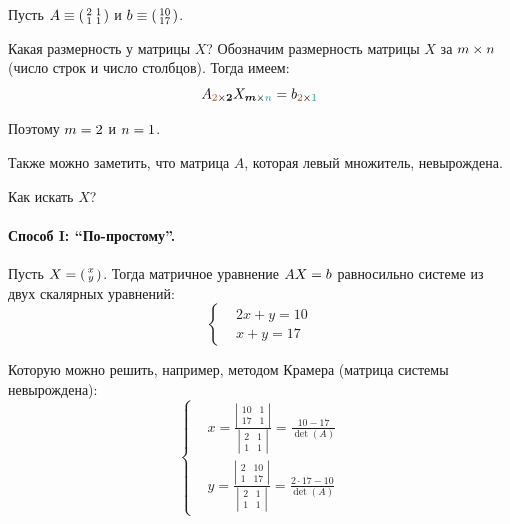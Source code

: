\documentclass[a4paper,12pt]{article}
\begin{document}
  \begin{solution}
    Пусть $A \hm\equiv \left(\begin{smallmatrix}
      2 & 1\\
      1 & 1
    \end{smallmatrix}\right)$ и $b \hm\equiv \left(\begin{smallmatrix}
      10\\
      17
    \end{smallmatrix}\right)$.
    
    Какая размерность у матрицы $X$?
    Обозначим размерность матрицы $X$ за $m \hm\times n$ (число строк и число столбцов).
    Тогда имеем:
    \[
      A_{\textcolor{red}{2} \times {\bds 2}} X_{{\bds m} \times \textcolor{cyan}{n}} = b_{\textcolor{red}{2} \times \textcolor{cyan}{1}}
    \]
    
    Поэтому $m \hm= 2$ и $n \hm= 1$.
    
    Также можно заметить, что матрица $A$, которая левый множитель, невырождена.
    
    Как искать $X$?
    
    \bigskip
    
    \paragraph{Способ I: ``По-простому''.}
    
    Пусть $X \hm= \left(\begin{smallmatrix}x \\ y\end{smallmatrix}\right)$.
    Тогда матричное уравнение $AX \hm= b$ равносильно системе из двух скалярных уравнений:
    \[
      \left\{
        \begin{aligned}
          &2x + y = 10\\
          &x + y = 17
        \end{aligned}
      \right.
    \]
    
    Которую можно решить, например, методом Крамера (матрица системы невырождена):
    \[
      \left\{
        \begin{aligned}
          &x = \frac{\left|\begin{smallmatrix}10 & 1 \\ 17 & 1\end{smallmatrix}\right|}{\left|\begin{smallmatrix}2 & 1 \\ 1 & 1\end{smallmatrix}\right|} = \frac{10 - 17}{\det(A)}\\
          &y = \frac{\left|\begin{smallmatrix}2 & 10 \\ 1 & 17\end{smallmatrix}\right|}{\left|\begin{smallmatrix}2 & 1 \\ 1 & 1\end{smallmatrix}\right|} = \frac{2 \cdot 17 - 10}{\det(A)}
        \end{aligned}
      \right.
    \]
    

\end{solution}
\end{document}

